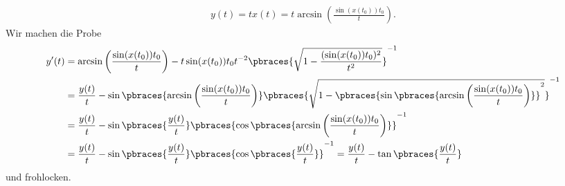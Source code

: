 \begin{solution}
\begin{itemize}
\begin{align*}
    y(t) = tx(t) = t\arcsin\left(\frac{\sin(x(t_0))t_0}{t}\right).
  \end{align*}
  Wir machen die Probe
  \begin{align*}
    y^\prime(t) &= \arcsin\left(\frac{\sin(x(t_0))t_0}{t}\right) - t \sin(x(t_0))t_0 t^{-2} \pbraces{\sqrt{1 - \frac{(\sin(x(t_0)) t_0)^2}{t^2}}}^{-1} \\
    &= \frac{y(t)}{t} - \sin\pbraces{\arcsin\left(\frac{\sin(x(t_0))t_0}{t}\right)} \pbraces{ \sqrt{1 - \pbraces{\sin\pbraces{\arcsin\left(\frac{\sin(x(t_0))t_0}{t}\right)}}^2} }^{-1} \\
    &= \frac{y(t)}{t} - \sin\pbraces{\frac{y(t)}{t}} \pbraces{\cos\pbraces{\arcsin\left(\frac{\sin(x(t_0))t_0}{t}\right)}}^{-1} \\
    &= \frac{y(t)}{t} - \sin\pbraces{\frac{y(t)}{t}} \pbraces{\cos\pbraces{\frac{y(t)}{t}}}^{-1} = \frac{y(t)}{t} - \tan\pbraces{\frac{y(t)}{t}}
  \end{align*}
  und frohlocken.
\end{itemize}
\end{solution}
